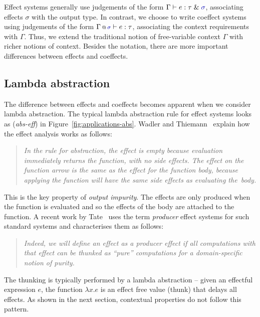 Effect systems generally use judgements of the form $\Gamma \vdash e : \tau \;\&\; \aclrd{\sigma}$, 
associating effects $\sigma$ with the output type. In contrast, we choose to write coeffect 
systems using judgements of the form $\coctx{\Gamma}{\aclrd{\sigma}} \vdash e : \tau$, associating
the context requirements with $\Gamma$. Thus, we extend the traditional notion of free-variable
context $\Gamma$ with richer notions of context. Besides the notation, there are more important 
differences between effects and coeffects.


\subsection{Lambda abstraction}

The difference between effects and coeffects becomes apparent when we consider lambda abstraction.
The typical lambda abstraction rule for effect systems looks as (\emph{abs-eff}) in 
Figure~\ref{fig:applications-abs}. Wadler and Thiemann~\cite{monads-effects-marriage} explain how 
the effect analysis works as follows:
%
\begin{quote}
\emph{In the rule for abstraction, the effect is empty because evaluation immediately
returns the function, with no side effects. The effect on the function arrow
is the same as the effect for the function body, because applying the function will
have the same side effects as evaluating the~body.}
\end{quote}
%
This is the key property of \emph{output impurity}. The effects are only produced when the
function is evaluated and so the effects of the body are attached to the function. A recent
work by Tate~\cite{effects-producer-semantics} uses the term \emph{producer} effect systems
for such standard systems and characterises them as follows:
%
\begin{quote}
\emph{Indeed, we will define an effect as a producer effect if all computations with that 
effect can be thunked as ``pure'' computations for a domain-specific notion of purity.}
\end{quote} 
%
The thunking is typically performed by a lambda abstraction -- given an effectful expression 
$e$, the function $\lambda x.e$ is an effect free value (thunk) that delays all effects.
As shown in the next section, contextual properties do not follow this pattern.

